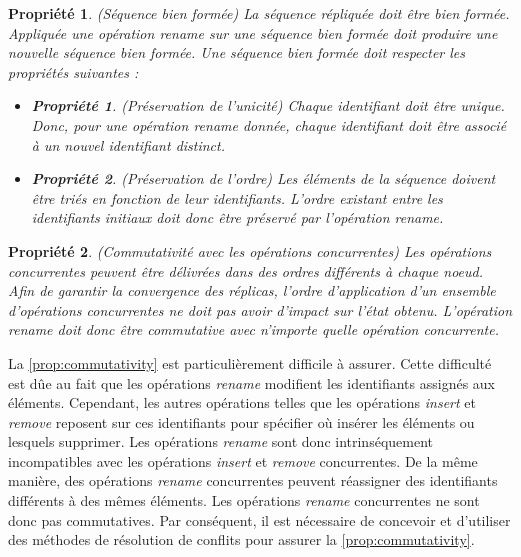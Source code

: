 \documentclass[12pt]{thesul}
\newtheorem{property}{Propriété}
\newtheorem{subproperty}{Propriété}[property]
\begin{document}
\begin{property}(Séquence bien formée)
  La séquence répliquée doit être bien formée.
  Appliquée une opération \emph{rename} sur une séquence bien formée doit produire une nouvelle séquence bien formée.
  Une séquence bien formée doit respecter les propriétés suivantes :
  \begin{itemize}[noitemsep]
    \item[~]
    \begin{subproperty}(Préservation de l'unicité)
      Chaque identifiant doit être unique.
      Donc, pour une opération \emph{rename} donnée, chaque identifiant doit être associé à un nouvel identifiant distinct.
    \end{subproperty}
    \item[~]
    \begin{subproperty}(Préservation de l'ordre)
      \label{prop:order}
      Les éléments de la séquence doivent être triés en fonction de leur identifiants.
      L'ordre existant entre les identifiants initiaux doit donc être préservé par l'opération \emph{rename}.
    \end{subproperty}
  \end{itemize}
\end{property}

\begin{property}(Commutativité avec les opérations concurrentes)
  \label{prop:commutativity}
  Les opérations concurrentes peuvent être délivrées dans des ordres différents à chaque noeud.
  Afin de garantir la convergence des réplicas, l'ordre d'application d'un ensemble d'opérations concurrentes ne doit pas avoir d'impact sur l'état obtenu.
  L'opération \emph{rename} doit donc être commutative avec n'importe quelle opération concurrente.
\end{property}

La \autoref{prop:commutativity} est particulièrement difficile à assurer.
Cette difficulté est dûe au fait que les opérations \emph{rename} modifient les identifiants assignés aux éléments.
Cependant, les autres opérations telles que les opérations \emph{insert} et \emph{remove} reposent sur ces identifiants pour spécifier où insérer les éléments ou lesquels supprimer.
Les opérations \emph{rename} sont donc intrinséquement incompatibles avec les opérations \emph{insert} et \emph{remove} concurrentes.
De la même manière, des opérations \emph{rename} concurrentes peuvent réassigner des identifiants différents à des mêmes éléments.
Les opérations \emph{rename} concurrentes ne sont donc pas commutatives.
Par conséquent, il est nécessaire de concevoir et d'utiliser des méthodes de résolution de conflits pour assurer la \autoref{prop:commutativity}.
\end{document}
